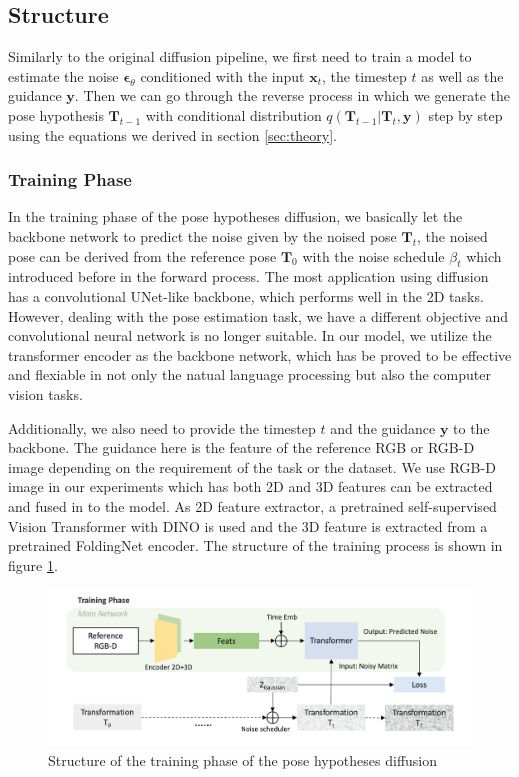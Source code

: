 \documentclass[12pt,DIV14,BCOR12mm,a4paper,footinclude=false,headinclude,parskip=half-,twoside,openright,cleardoublepage=empty,toc=index,bibliography=totoc,listof=totoc]{scrreprt}
\numberwithin{equation}{chapter}
\begin{document}
\subsection{Structure}
Similarly to the original diffusion pipeline, we first need to train a model to estimate the noise $\boldsymbol{\epsilon}_{\theta}$ conditioned with the input $\mathbf{x}_{t}$, the timestep $t$ as well as the guidance $\mathbf{y}$. Then we can go through the reverse process in which we generate the pose hypothesis $\mathbf{T}_{t-1}$ with conditional distribution $q(\mathbf{T}_{t-1}|\mathbf{T}_{t},\mathbf{y})$ step by step using the equations we derived in section \ref{sec:theory}.
\subsubsection{Training Phase}
In the training phase of the pose hypotheses diffusion, we basically let the backbone network to predict the noise given by the noised pose $\mathbf{T}_{t}$, the noised pose can be derived from the reference pose $\mathbf{T}_{0}$ with the noise schedule $\beta_{t}$ which introduced before in the forward process. The most application using diffusion has a convolutional UNet-like backbone\cite{ronneberger2015unet}, which performs well in the 2D tasks. However, dealing with the pose estimation task, we have a different objective and convolutional neural network is no longer suitable. In our model, we utilize the transformer encoder as the backbone network, which has be proved to be effective and flexiable in not only the natual language processing but also the computer vision tasks.

Additionally, we also need to provide the timestep $t$ and the guidance $\mathbf{y}$ to the backbone. The guidance here is the feature of the reference RGB or RGB-D image depending on the requirement of the task or the dataset. We use RGB-D image in our experiments which has both 2D and 3D features can be extracted and fused in to the model. As 2D feature extractor, a pretrained self-supervised Vision Transformer
 with DINO\cite{caron2021emerging} is used and the 3D feature is extracted from a pretrained FoldingNet encoder\cite{yang2018foldingnet}. The structure of the training process is shown in figure \ref{img:train}.

\begin{figure}[h]
	\centering
	\includegraphics[scale=.23]{img/train.png}
	\caption{Structure of the training phase of the pose hypotheses diffusion}
	\label{img:train}
\end{figure}
\end{document}
